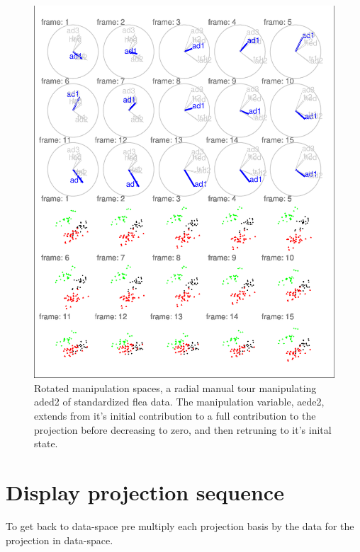 \documentclass{monashthesis}
\begin{document}
\begin{figure}
\centering
\includegraphics{thesis_files/figure-latex/step3-1.pdf}
\caption{\label{fig:step3}Rotated manipulation spaces, a radial manual tour manipulating aded2 of standardized flea data. The manipulation variable, aede2, extends from it's initial contribution to a full contribution to the projection before decreasing to zero, and then retruning to it's inital state.}
\end{figure}

\hypertarget{display-projection-sequence}{%
\section{Display projection sequence}\label{display-projection-sequence}}

To get back to data-space pre multiply each projection basis by the data for the projection in data-space.
\end{document}
